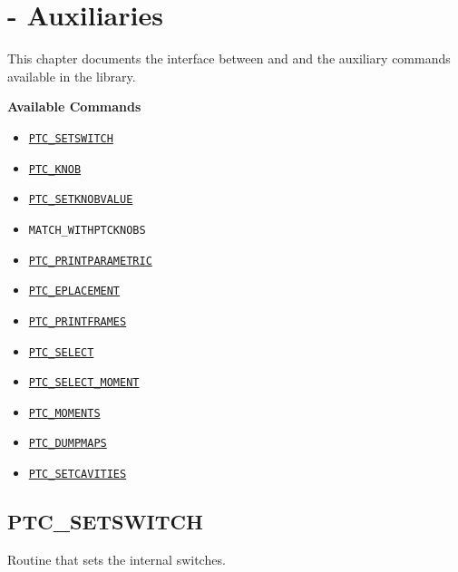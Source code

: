 
\chapter{{\madx}-{\ptc} Auxiliaries}
\label{chap:ptc_auxiliaries}

This chapter documents the interface between \madx and \ptc and the
auxiliary commands available in the \ptc library.

{\bf Available Commands }
\begin{itemize}
   \item \hyperref[sec:ptc_setswitch]{\tt PTC\_SETSWITCH}
   \item \hyperref[sec:ptc_knob]{\tt PTC\_KNOB}
   \item \hyperref[sec:ptc_setknobvalue]{\tt PTC\_SETKNOBVALUE}
   \item {\tt MATCH\_WITHPTCKNOBS}  
   \item \hyperref[sec:ptc_printparametric]{\tt PTC\_PRINTPARAMETRIC}
   \item \hyperref[sec:ptc_eplacement]{\tt PTC\_EPLACEMENT}
   \item \hyperref[sec:ptc_printframes]{\tt PTC\_PRINTFRAMES}
   \item \hyperref[sec:ptc_select]{\tt PTC\_SELECT}
   \item \hyperref[sec:ptc_select_moment]{\tt PTC\_SELECT\_MOMENT}
   \item \hyperref[sec:ptc_moments]{\tt PTC\_MOMENTS}  
   \item \hyperref[sec:ptc_dumpmaps]{\tt PTC\_DUMPMAPS}
   \item \hyperref[sec:ptc_setcavities]{\tt PTC\_SETCAVITIES}
\end{itemize}

\newpage

\section{PTC\_SETSWITCH}
\label{sec:ptc_setswitch}

Routine that sets the internal \ptc switches.


